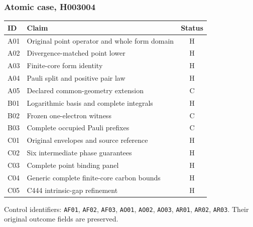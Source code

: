 \subsubsection{Atomic case, H003004}
\begin{center}\small\begin{tabular}{lp{2.15in}c}\toprule ID&Claim&Status\\\midrule
A01&Original point operator and whole form domain&H\\
A02&Divergence-matched point lower&H\\
A03&Finite-core form identity&H\\
A04&Pauli split and positive pair law&H\\
A05&Declared common-geometry extension&C\\
B01&Logarithmic basis and complete integrals&H\\
B02&Frozen one-electron witness&C\\
B03&Complete occupied Pauli prefixes&C\\
C01&Original envelopes and source reference&H\\
C02&Six intermediate phase guarantees&H\\
C03&Complete point binding panel&H\\
C04&Generic complete finite-core carbon bounds&H\\
C05&C444 intrinsic-gap refinement&H\\
\bottomrule\end{tabular}\end{center}
Control identifiers: \texttt{AF01}, \texttt{AF02}, \texttt{AF03}, \texttt{AO01}, \texttt{AO02}, \texttt{AO03}, \texttt{AR01}, \texttt{AR02}, \texttt{AR03}. Their original outcome fields are preserved.
